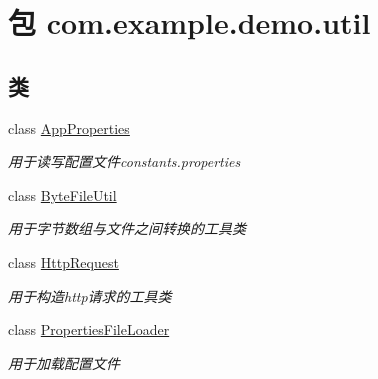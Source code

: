 \hypertarget{namespacecom_1_1example_1_1demo_1_1util}{}\section{包 com.\+example.\+demo.\+util}
\label{namespacecom_1_1example_1_1demo_1_1util}
\subsection*{类}
\begin{DoxyCompactItemize}
\item 
class \mbox{\hyperlink{classcom_1_1example_1_1demo_1_1util_1_1_app_properties}{App\+Properties}}
\begin{DoxyCompactList}\small\item\em 用于读写配置文件constants.\+properties \end{DoxyCompactList}\item 
class \mbox{\hyperlink{classcom_1_1example_1_1demo_1_1util_1_1_byte_file_util}{Byte\+File\+Util}}
\begin{DoxyCompactList}\small\item\em 用于字节数组与文件之间转换的工具类 \end{DoxyCompactList}\item 
class \mbox{\hyperlink{classcom_1_1example_1_1demo_1_1util_1_1_http_request}{Http\+Request}}
\begin{DoxyCompactList}\small\item\em 用于构造http请求的工具类 \end{DoxyCompactList}\item 
class \mbox{\hyperlink{classcom_1_1example_1_1demo_1_1util_1_1_properties_file_loader}{Properties\+File\+Loader}}
\begin{DoxyCompactList}\small\item\em 用于加载配置文件 \end{DoxyCompactList}\end{DoxyCompactItemize}
